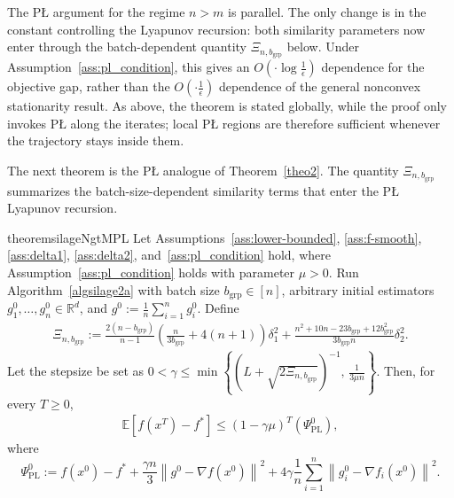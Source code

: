 \documentclass{article}
\newcommand{\bb}{\mathbb}
\newcommand{\R}{\bb R}
\newcommand{\sqn}[1]{\left\| #1 \right\|^2}
\newcommand{\nf}[1]{\nabla f\rb{#1}}
\newcommand{\fstar}{f^*}
\newcommand{\eqdef}{:=}
\newcommand{\Exp}[1]{{\bb E}\left[#1\right]}
\newcommand{\rb}[1]{\left(#1\right)}
\newcommand {\rbl}[1]{(#1)} %
\renewcommand{\nf}[1]{\nabla f\rbl{#1}}
\newcommand{\nfi}[1]{\nabla f_i\rbl{#1}}
\theoremstyle{plain}
\begin{document}
The P\L{} argument for the regime $n>m$ is parallel.
The only change is in the constant controlling the Lyapunov recursion: both similarity parameters now enter through the batch-dependent quantity $\Xi_{n,b_{\mathrm{grp}}}$ below.
Under Assumption~\ref{ass:pl_condition}, this gives an $O\left(\cdot\log\frac{1}{\epsilon}\right)$ dependence for the objective gap, rather than the $O\left(\cdot\frac{1}{\epsilon}\right)$ dependence of the general nonconvex stationarity result.
As above, the theorem is stated globally, while the proof only invokes P\L{} along the iterates; local P\L{} regions are therefore sufficient whenever the trajectory stays inside them.

The next theorem is the P\L{} analogue of Theorem~\ref{theo2}.
The quantity $\Xi_{n,b_{\mathrm{grp}}}$ summarizes the batch-size-dependent similarity terms that enter the P\L{} Lyapunov recursion.

\begin{restatable}{theorem}{silageNgtMPL}
\label{theo:silage_pl_ngtm}
Let Assumptions~\ref{ass:lower-bounded}, \ref{ass:f-smooth}, \ref{ass:delta1}, \ref{ass:delta2}, and~\ref{ass:pl_condition} hold,
where Assumption~\ref{ass:pl_condition} holds with parameter $\mu>0$.
Run Algorithm~\ref{algsilage2a} with batch size $b_{\mathrm{grp}}\in[n]$, arbitrary initial estimators
$g_1^0,\ldots,g_n^0\in\R^d$, and $g^0\eqdef \frac1n\sum_{i=1}^n g_i^0$.
Define
\begin{align}
\Xi_{n,b_{\mathrm{grp}}}
\eqdef
\frac{2(n-b_{\mathrm{grp}})}{n-1}\rb{\frac{n}{3b_{\mathrm{grp}}}+4(n+1)}\delta_1^2
+\frac{n^2+10n-23b_{\mathrm{grp}}+12b_{\mathrm{grp}}^2}{3b_{\mathrm{grp}}n}\delta_2^2.
\label{eq:Xi_nb_def}
\end{align}
Let the stepsize be set as
$0<\gamma\le \min\left\{\rb{L+\sqrt{2\Xi_{n,b_{\mathrm{grp}}}}}^{-1},\,\frac{1}{3\mu n}\right\}$.
Then, for every $T\ge 0$,
\begin{align}
\Exp{f(x^T)-\fstar}
\le
(1-\gamma\mu)^T\rb{\Psi_{\mathrm{PL}}^0},
\label{eq:silage_pl_rate_ngtm}
\end{align}
where
\begin{equation*}
\Psi_{\mathrm{PL}}^0
\eqdef
f(x^0)-\fstar
+\frac{\gamma n}{3}\sqn{g^0-\nf{x^0}}
+4\gamma\frac1n\sum_{i=1}^n\sqn{g_i^0-\nfi{x^0}}.
\end{equation*}
\end{restatable}
\end{document}
